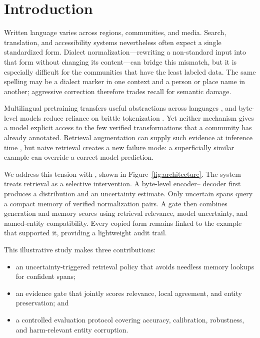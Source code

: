 \section{Introduction}
\label{sec:introduction}

Written language varies across regions, communities, and media. Search,
translation, and accessibility systems nevertheless often expect a single
standardized form. Dialect normalization---rewriting a non-standard input into
that form without changing its content---can bridge this mismatch, but it is
especially difficult for the communities that have the least labeled data.
The same spelling may be a dialect marker in one context and a person or place
name in another; aggressive correction therefore trades recall for semantic
damage.

Multilingual pretraining transfers useful abstractions across languages
\citep{devlin2019bert,conneau2020xlmr}, and byte-level models reduce reliance
on brittle tokenization \citep{xue2022byt5}. Yet neither mechanism gives a
model explicit access to the few verified transformations that a community
has already annotated. Retrieval augmentation can supply such evidence at
inference time \citep{lewis2020rag,khandelwal2021knnmt}, but naive retrieval
creates a new failure mode: a superficially similar example can override a
correct model prediction.

We address this tension with \method, shown in Figure~\ref{fig:architecture}.
The system treats retrieval as a selective intervention. A byte-level encoder--
decoder first produces a distribution and an uncertainty estimate. Only
uncertain spans query a compact memory of verified normalization pairs. A gate
then combines generation and memory scores using retrieval relevance, model
uncertainty, and named-entity compatibility. Every copied form remains linked
to the example that supported it, providing a lightweight audit trail.

This illustrative study makes three contributions:
\begin{itemize}
  \item an uncertainty-triggered retrieval policy that avoids needless memory
        lookups for confident spans;
  \item an evidence gate that jointly scores relevance, local agreement, and
        entity preservation; and
  \item a controlled evaluation protocol covering accuracy, calibration,
        robustness, and harm-relevant entity corruption.
\end{itemize}

